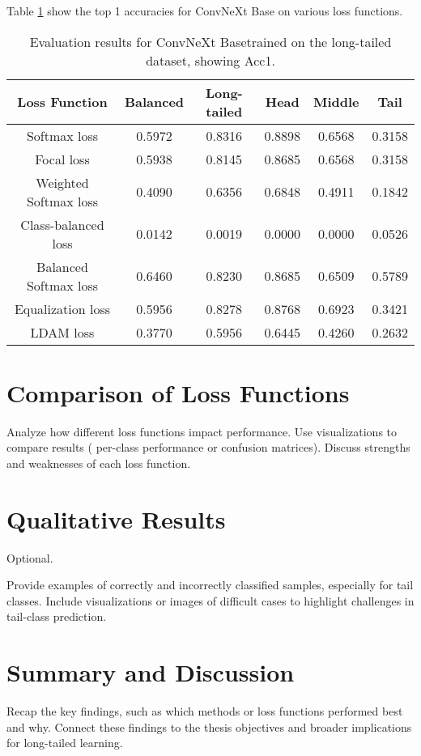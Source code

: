 Table \ref{tab:conv_lt_acc1_1} show the top 1 accuracies for ConvNeXt Base on various loss functions.

\begin{table}[h!]
    \centering
    \begin{tabular}{cccccc}
        \toprule
        Loss Function & Balanced & Long-tailed & Head & Middle & Tail \\ 
        \midrule
        Softmax loss   & 0.5972 & 0.8316 & 0.8898 & 0.6568 & 0.3158 \\
        Focal loss   & 0.5938 & 0.8145 & 0.8685 & 0.6568 & 0.3158 \\
        Weighted Softmax loss   & 0.4090 & 0.6356 & 0.6848 & 0.4911 & 0.1842 \\
        Class-balanced loss   & 0.0142 & 0.0019 & 0.0000 & 0.0000 & 0.0526 \\
        Balanced Softmax loss   & 0.6460 & 0.8230 & 0.8685 & 0.6509 & 0.5789 \\
        Equalization loss   & 0.5956 & 0.8278 & 0.8768 & 0.6923 & 0.3421 \\
        LDAM loss   & 0.3770 & 0.5956 & 0.6445 & 0.4260 & 0.2632 \\
        \bottomrule
    \end{tabular}
    \caption{Evaluation results for ConvNeXt Basetrained on the long-tailed dataset, showing Acc1.}
    \label{tab:conv_lt_acc1_1}
\end{table}

\section{Comparison of Loss Functions}
Analyze how different loss functions impact performance.
Use visualizations to compare results ( per-class performance or confusion matrices).
Discuss strengths and weaknesses of each loss function.

\section{Qualitative Results}
Optional.

Provide examples of correctly and incorrectly classified samples, especially for tail classes.
Include visualizations or images of difficult cases to highlight challenges in tail-class prediction.



\section{Summary and Discussion}
Recap the key findings, such as which methods or loss functions performed best and why.
Connect these findings to the thesis objectives and broader implications for long-tailed learning.